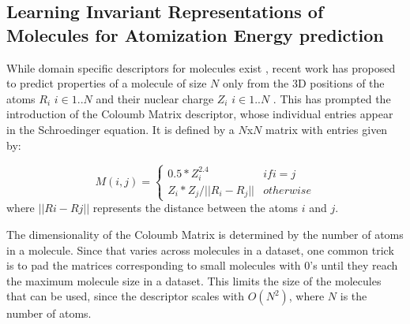 \documentclass[10pt,journal,a4paper]{IEEEtran}
\begin{document}
%


\subsection{Learning Invariant Representations of Molecules for Atomization Energy prediction}

While domain specific descriptors for molecules exist \cite{todeschini2000handbook}, recent work \cite{initialcoloumb} has proposed to predict properties of a molecule of size $N$ only from the 3D positions of the atoms $R_i$ $i\in{1..N}$ and their nuclear charge $Z_i$ $i\in{1..N}$ . This has prompted the introduction of the Coloumb Matrix descriptor, whose individual entries appear in the Schroedinger equation. It is defined by a $N$x$N$ matrix with entries given by:

\begin{equation}
M(i,j) = \left\{
  \begin{array}{lr}
    0.5*Z_i^{2.4} & if i = j\\
    Z_i * Z_j / ||R_i - R_j|| & otherwise
  \end{array}
\right.
\end{equation}
where $||Ri - Rj||$ represents the distance between the atoms $i$ and $j$.

The dimensionality of the Coloumb Matrix is determined by the number of atoms in a molecule. Since that varies across molecules in a dataset, one common trick is to pad the matrices corresponding to small molecules with 0's until they reach the maximum molecule size in a dataset. This limits the size of the molecules that can be used, since the descriptor scales with $O(N^2)$, where $N$ is the number of atoms.
\end{document}
